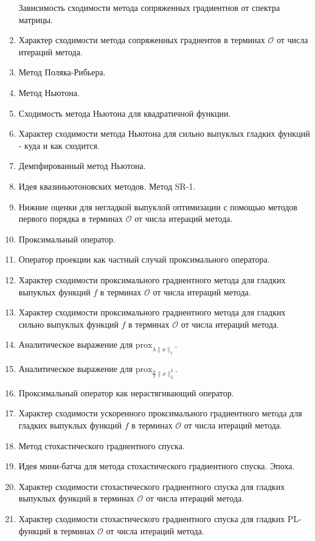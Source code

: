 \documentclass[
  letterpaper,
  DIV=11,
  numbers=noendperiod]{scrartcl}
\begin{document}
\begin{enumerate}
  Зависимость сходимости метода сопряженных градиентнов от спектра
  матрицы.
\item
  Характер сходимости метода сопряженных градиентов в терминах
  \(\mathcal{O}\) от числа итераций метода.
\item
  Метод Поляка-Рибьера.
\item
  Метод Ньютона.
\item
  Сходимость метода Ньютона для квадратичной функции.
\item
  Характер сходимости метода Ньютона для сильно выпуклых гладких функций
  - куда и как сходится.
\item
  Демпфированный метод Ньютона.
\item
  Идея квазиньютоновских методов. Метод SR-1.
\item
  Нижние оценки для негладкой выпуклой оптимизации с помощью методов
  первого порядка в терминах \(\mathcal{O}\) от числа итераций метода.
\item
  Проксимальный оператор.
\item
  Оператор проекции как частный случай проксимального оператора.
\item
  Характер сходимости проксимального градиентного метода для гладких
  выпуклых функций \(f\) в терминах \(\mathcal{O}\) от числа итераций
  метода.
\item
  Характер сходимости проксимального градиентного метода для гладких
  сильно выпуклых функций \(f\) в терминах \(\mathcal{O}\) от числа
  итераций метода.
\item
  Аналитическое выражение для \(\text{prox}_{\lambda \|x\|_1}\).
\item
  Аналитическое выражение для \(\text{prox}_{\frac{\mu}{2} \|x\|_2^2}\).
\item
  Проксимальный оператор как нерастягивающий оператор.
\item
  Характер сходимости ускоренного проксимального градиентного метода для
  гладких выпуклых функций \(f\) в терминах \(\mathcal{O}\) от числа
  итераций метода.
\item
  Метод стохастического градиентного спуска.
\item
  Идея мини-батча для метода стохастического градиентного спуска. Эпоха.
\item
  Характер сходимости стохастического градиентного спуска для гладких
  выпуклых функций в терминах \(\mathcal{O}\) от числа итераций метода.
\item
  Характер сходимости стохастического градиентного спуска для гладких
  PL-функций в терминах \(\mathcal{O}\) от числа итераций метода.

\end{enumerate}
\end{document}
